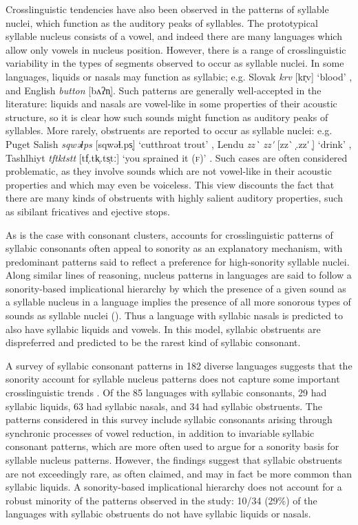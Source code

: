   Crosslinguistic tendencies have also been observed in the patterns of syllable nuclei, which function as the auditory peaks of syllables. The prototypical syllable nucleus consists of a vowel, and indeed there are many languages which allow only vowels in nucleus position. However, there is a range of crosslinguistic variability in the types of segments observed to occur as syllable nuclei. In some languages, liquids or nasals may function as syllabic; e.g. Slovak \textit{krv} [kr̩v] ‘blood’ \citep[186]{Zec2007}, and English \textit{button} [bʌʔn̩]. Such patterns are generally well-accepted in the literature: liquids and nasals are vowel-like in some properties of their acoustic structure, so it is clear how such sounds might function as auditory peaks of syllables. More rarely, obstruents are reported to occur as syllable nuclei: e.g. Puget Salish \textit{sqwəɬps} [sqwəɬ.ps̩] ‘cutthroat trout’ \citep[62]{Hoard1978}, Lendu \textit{zz\`{} zz\'{} } [zz\`{} ̩.zz\'{} ̩] ‘drink’ \citep[483]{Demolin2002}, Tashlhiyt \textit{tftktstt} [tf̩.tk̩.ts̩tː] ‘you sprained it (\textsc{f})’ \citep[332]{Ridouane2008}. Such cases are often considered problematic, as they involve sounds which are not vowel-like in their acoustic properties and which may even be voiceless. This view discounts the fact that there are many kinds of obstruents with highly salient auditory properties, such as sibilant fricatives and ejective stops.

  As is the case with consonant clusters, accounts for crosslinguistic patterns of syllabic consonants often appeal to sonority as an explanatory mechanism, with predominant patterns said to reflect a preference for high-sonority syllable nuclei. Along similar lines of reasoning, nucleus patterns in languages are said to follow a sonority-based implicational hierarchy by which the presence of a given sound as a syllable nucleus in a language implies the presence of all more sonorous types of sounds as syllable nuclei (\citealt{Blevins1995,Zec2007}). Thus a language with syllabic nasals is predicted to also have syllabic liquids and vowels. In this model, syllabic obstruents are dispreferred and predicted to be the rarest kind of syllabic consonant.

  A survey of syllabic consonant patterns in 182 diverse languages suggests that the sonority account for syllable nucleus patterns does not capture some important crosslinguistic trends \citep{Bell1978a}. Of the 85 languages with syllabic consonants, 29 had syllabic liquids, 63 had syllabic nasals, and 34 had syllabic obstruents. The patterns considered in this survey include syllabic consonants arising through synchronic processes of vowel reduction, in addition to invariable syllabic consonant patterns, which are more often used to argue for a sonority basis for syllable nucleus patterns. However, the findings suggest that syllabic obstruents are not exceedingly rare, as often claimed, and may in fact be more common than syllabic liquids. A sonority-based implicational hierarchy does not account for a robust minority of the patterns observed in the study: 10/34 (29\%) of the languages with syllabic obstruents do not have syllabic liquids or nasals.

